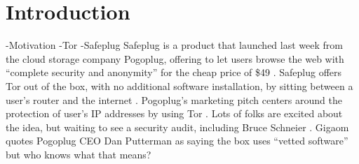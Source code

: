 \section{Introduction}
\label{sec:intro}
    -Motivation
    -Tor
    -Safeplug
Safeplug is a product that launched last week from the cloud storage company Pogoplug, offering to let users browse the web with “complete security and anonymity” for the cheap price of \$49 \cite{safeplug}.  Safeplug offers Tor out of the box, with no additional software installation, by sitting between a user’s router and the internet \cite{wired}.  Pogoplug’s marketing pitch centers around the protection of user’s IP addresses by using Tor \cite{safeplug,bittech}.  Lots of folks are excited about the idea, but waiting to see a security audit, including Bruce Schneier \cite{schneier}.  Gigaom quotes Pogoplug CEO Dan Putterman as saying the box uses “vetted software” \cite{gigaom} but who knows what that means?
